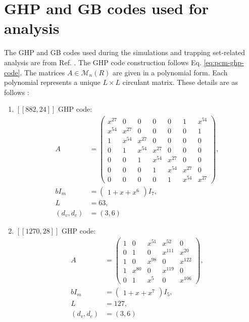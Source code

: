 \documentclass[%
 reprint,
 amsmath,amssymb,
 aps,
pra,
showkeys,
]{revtex4-2}
\begin{document}
\section{GHP and GB codes used for analysis}
\label{ap:codes}
The GHP and GB codes used during the simulations and trapping set-related analysis are from Ref. \cite{panteleev2021degenerate}.
The GHP code construction follows Eq. \ref{eq:pcm-ghp-code}.
The matrices $A \in \mathcal{M}_n(R)$ are given in a polynomial form.
Each polynomial represents a unique $L \times L$ circulant matrix.
These details are as follows \cite{panteleev2021degenerate}:
\begin{enumerate}
    \item $[[882,24]]$ GHP code:
        \begin{align}
            \label{eq:882-24-ghp}
            A &= \begin{pmatrix}
                x^{27} & 0 & 0 & 0 & 0 & 1 & x^{54}\\
                x^{54} & x^{27} & 0 & 0 & 0 & 0 & 1\\
                1 & x^{54} & x^{27} & 0 & 0 & 0 & 0\\
                0 & 1 & x^{54} & x^{27} & 0 & 0 & 0\\
                0 & 0 & 1 & x^{54} & x^{27} & 0 & 0\\
                0 & 0 & 0 & 1 & x^{54} & x^{27} & 0\\
                0 & 0 & 0 & 0 & 1 & x^{54} & x^{27}
            \end{pmatrix},\\
            bI_m &= \begin{pmatrix}
                1 + x + x^6
            \end{pmatrix}I_7,\\
            L &= 63,\\
            (d_v, d_c) & = (3,6)
        \end{align}
    \item $[[1270,28]]$ GHP code:
        \begin{align}
            \label{eq:1270-28-ghp}
            A &= \begin{pmatrix}
                1 & 0 & x^{51} & x^{52} & 0\\
                0 & 1 & 0 & x^{111} & x^{20}\\
                1 & 0 & x^{98} & 0 & x^{122}\\
                1 & x^{80} & 0 & x^{119} & 0\\
                0 & 1 & x^5 & 0 & x^{106}
            \end{pmatrix},\\
            bI_m &= \begin{pmatrix}
                1 + x + x^7
            \end{pmatrix}I_5,\\
            L &= 127,\\
            (d_v, d_c) & = (3,6)
        \end{align}
\end{enumerate}
\end{document}
